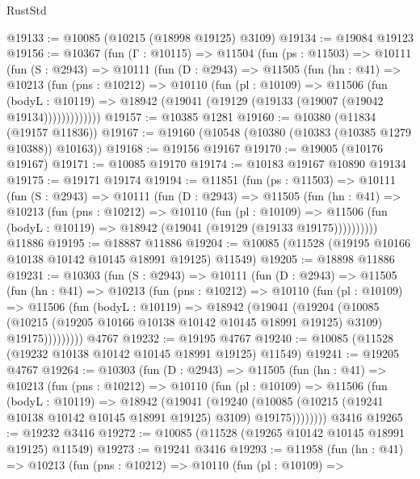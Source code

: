 \begin{lexlean}{RustStd}
\begin{coremodule}
@19133 := @10085 (@10215 (@18998 @19125) @3109)
@19134 := @19084 @19123
@19156 := @10367
    (fun (Γ : @10115) =>
    @11504
      (fun (ps : @11503) =>
      @10111
        (fun (S : @2943) =>
        @10111
          (fun (D : @2943) =>
          @11505
            (fun (hn : @41) =>
            @10213
              (fun (pns : @10212) =>
              @10110
                (fun (pl : @10109) =>
                @11506
                  (fun (bodyL : @10119) =>
                  @18942 (@19041 (@19129 (@19133 (@19007 (@19042 @19134)))))))))))))
@19157 := @10385 @1281
@19160 := @10380 (@11834 (@19157 @11836))
@19167 := @19160 (@10548 (@10380 (@10383 (@10385 @1279 @10388)) @10163))
@19168 := @19156 @19167
@19170 := @19005 (@10176 @19167)
@19171 := @10085 @19170
@19174 := @10183 @19167 @10890 @19134
@19175 := @19171 @19174
@19194 := @11851
    (fun (ps : @11503) =>
    @10111
      (fun (S : @2943) =>
      @10111
        (fun (D : @2943) =>
        @11505
          (fun (hn : @41) =>
          @10213
            (fun (pns : @10212) =>
            @10110
              (fun (pl : @10109) =>
              @11506 (fun (bodyL : @10119) => @18942 (@19041 (@19129 (@19133 @19175))))))))))
    @11886
@19195 := @18887 @11886
@19204 := @10085 (@11528 (@19195 @10166 @10138 @10142 @10145 @18991 @19125) @11549)
@19205 := @18898 @11886
@19231 := @10303
    (fun (S : @2943) =>
    @10111
      (fun (D : @2943) =>
      @11505
        (fun (hn : @41) =>
        @10213
          (fun (pns : @10212) =>
          @10110
            (fun (pl : @10109) =>
            @11506
              (fun (bodyL : @10119) =>
              @18942
                (@19041
                  (@19204
                    (@10085
                      (@10215 (@19205 @10166 @10138 @10142 @10145 @18991 @19125) @3109)
                      @19175)))))))))
    @4767
@19232 := @19195 @4767
@19240 := @10085 (@11528 (@19232 @10138 @10142 @10145 @18991 @19125) @11549)
@19241 := @19205 @4767
@19264 := @10303
    (fun (D : @2943) =>
    @11505
      (fun (hn : @41) =>
      @10213
        (fun (pns : @10212) =>
        @10110
          (fun (pl : @10109) =>
          @11506
            (fun (bodyL : @10119) =>
            @18942
              (@19041
                (@19240
                  (@10085 (@10215 (@19241 @10138 @10142 @10145 @18991 @19125) @3109) @19175))))))))
    @3416
@19265 := @19232 @3416
@19272 := @10085 (@11528 (@19265 @10142 @10145 @18991 @19125) @11549)
@19273 := @19241 @3416
@19293 := @11958
    (fun (hn : @41) =>
    @10213
      (fun (pns : @10212) =>
      @10110
        (fun (pl : @10109) =>

\end{coremodule}
\end{lexlean}
